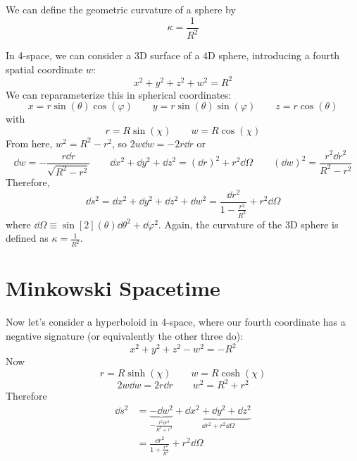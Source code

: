 \documentclass[a4paper,twoside,master.tex]{subfiles}
\begin{document}
We can define the geometric curvature of a sphere by
\begin{equation}
    \kappa = \frac{1}{R^2}
\end{equation}


In 4-space, we can consider a 3D surface of a 4D sphere, introducing a fourth spatial coordinate $ w $:
\begin{equation}
    x^2 + y^2 + z^2 + w^2 = R^2
\end{equation}
We can reparameterize this in spherical coordinates:
\begin{equation}
    x = r \sin(\theta) \cos(\varphi) \qquad y = r \sin(\theta) \sin(\varphi) \qquad z = r \cos(\theta)
\end{equation}
with
\begin{equation}
    r = R \sin(\chi) \qquad w = R \cos(\chi)
\end{equation}
From here, $ w^2 = R^2 - r^2 $, so $ 2w \dd{w} = - 2 r \dd{r} $ or
\begin{equation}
    \dd{w} = - \frac{r \dd{r}}{\sqrt{R^2 - r^2}} \qquad \dd{x}^2 + \dd{y}^2 + \dd{z}^2 = (\dd{r})^2 + r^2 \dd{\Omega} \qquad (\dd{w})^2 = \frac{r^2 \dd{r}^2}{R^2 - r^2}
\end{equation}
Therefore,
\begin{equation}
    \dd{s}^2 = \dd{x}^2 + \dd{y}^2 + \dd{z}^2 + \dd{w}^2 = \frac{\dd{r}^2}{1 - \frac{r^2}{R^2}} + r^2 \dd{\Omega}
\end{equation}
where $ \dd{\Omega} \equiv \sin[2](\theta) \dd{\theta}^2 + \dd{\varphi}^2 $. Again, the curvature of the 3D sphere is defined as $ \kappa = \frac{1}{R^2} $.

\section{Minkowski Spacetime}\label{sec:minkowski_spacetime}

Now let's consider a hyperboloid in 4-space, where our fourth coordinate has a negative signature (or equivalently the other three do):
\begin{equation}
    x^2 + y^2 + z^2 - w^2 = - R^2
\end{equation}
Now
\begin{equation}
    r = R \sinh(\chi) \qquad w = R \cosh(\chi)
\end{equation}
\begin{equation}
    2w \dd{w} = 2r \dd{r} \qquad w^2 = R^2 + r^2
\end{equation}
Therefore
\begin{align}
    \dd{s}^2 &= \underbrace{- \dd{w}^2}_{- \frac{r^2 \dd{r}^2}{R^2 + r^2}} + \underbrace{\dd{x}^2 + \dd{y}^2 + \dd{z}^2}_{\dd{r}^2 + r^2 \dd{\Omega}} \\
             &= \frac{\dd{r}^2}{1 + \frac{r^2}{R^2}} + r^2 \dd{\Omega}
\end{align}
\end{document}
